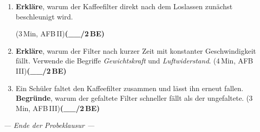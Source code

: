 \documentclass[11pt,a4paper]{article}
\newcommand{\BEZEIT}[3]{%
\hfill{\small\color{zeitgray}(#1\,Min, AFB\,#2)}\quad\textbf{(\_\_/#3\,BE)}%
}
\begin{document}
\begin{enumerate}
\item[a)] \textbf{Erkläre}, warum der Kaffeefilter direkt nach dem Loslassen zunächst beschleunigt wird.

\hfill{\small\color{zeitgray}(3\,Min, AFB\,II)}\quad\textbf{(\_\_/2\,BE)}

\vspace{3.7cm}

\item[b)] \textbf{Erkläre}, warum der Filter nach kurzer Zeit mit konstanter Geschwindigkeit fällt. Verwende die Begriffe \textit{Gewichtskraft} und \textit{Luftwiderstand}. \BEZEIT{4}{III}{2}

\vspace{5cm}

\item[c)] Ein Schüler faltet den Kaffeefilter zusammen und lässt ihn erneut fallen. \textbf{Begründe}, warum der gefaltete Filter schneller fällt als der ungefaltete. \BEZEIT{3}{III}{2}

\vspace{4cm}

\end{enumerate}

\vspace{1cm}

\begin{center}
\textit{--- Ende der Probeklausur ---}
\end{center}
\end{document}
